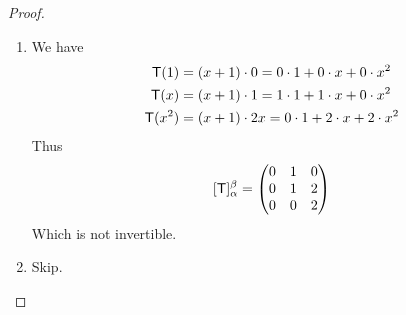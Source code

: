 \begin{proof}
\begin{enumerate}
\item We have
\begin{align*}
    \textsf{T}(1) & = (x + 1) \cdot 0 = 0 \cdot 1 + 0 \cdot x + 0 \cdot x^2 \\
    \textsf{T}(x) & = (x + 1) \cdot 1 = 1 \cdot 1 + 1 \cdot x + 0 \cdot x^2 \\
    \textsf{T}(x^2) & = (x + 1) \cdot 2x = 0 \cdot 1 + 2 \cdot x + 2 \cdot x^2
\end{align*}
Thus
\[
    [\textsf{T}]_{\alpha}^{\beta} = \begin{pmatrix} 0 & 1 & 0 \\ 0 & 1 & 2 \\ 0 & 0 & 2 \end{pmatrix}
\]
Which is not invertible.

\item Skip.


\end{enumerate}
\end{proof}
